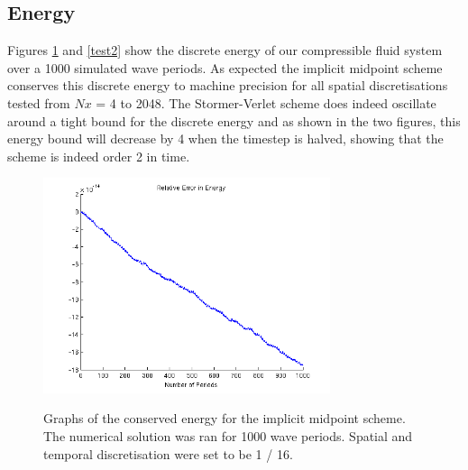 \documentclass[a4paper,11pt]{article}
\begin{document}
\subsection{Energy}

Figures \ref{test} and \ref{test2} show the discrete energy of our compressible fluid system over a 1000 simulated wave periods. As expected the implicit midpoint scheme conserves this discrete energy to machine precision for all spatial discretisations tested from $Nx$ = 4 to 2048.  The Stormer-Verlet scheme does indeed oscillate around a tight bound for the discrete energy and as shown in the two figures, this energy bound will decrease by 4 when the timestep is halved, showing that the scheme is indeed order 2 in time. 

\begin{figure}
    \centering
    \includegraphics[width=0.75\textwidth]{error1.png}
    \label{test}
    \caption{Graphs of the conserved energy for the implicit midpoint scheme. The numerical solution was ran for 1000 wave periods. Spatial and temporal  discretisation were set to be 1 / 16. }
\end{figure}
\end{document}
